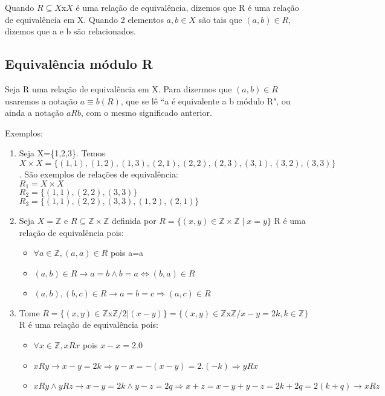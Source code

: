 Quando $R\subseteq X$x$X$ {\'e} uma rela{\c c}{\~a}o de equival{\^e}ncia, dizemos que R {\'e} uma rela{\c c}{\~a}o de equival{\^e}ncia em X. Quando 2 elementos $a,b\in X$ s{\~a}o tais que $(a,b)\in R$, dizemos que a e b s{\~a}o relacionados.\\

\subsection{Equival{\^e}ncia m{\'o}dulo R}

\begin{nota}
Seja R uma rela{\c c}{\~a}o de equival{\^e}ncia em X. Para dizermos que $(a,b)\in R$ usaremos a nota{\c c}{\~a}o $a\equiv b(R)$, que se l{\^e} ``a é equivalente a b m{\'o}dulo R", ou ainda a nota{\c c}{\~a}o $aRb$, com o mesmo significado anterior.
\end{nota}

Exemplos:
\begin{enumerate}
\item Seja X=\{1,2,3\}. Temos $X\times X=\{(1,1),(1,2),(1,3),(2,1),(2,2),(2,3),(3,1),(3,2),(3,3)\}$.
S{\~a}o exemplos de rela{\c c}{\~o}es de equival{\^e}ncia:\\
$R_{1}=X\times X$\\
$R_{2}=\{(1,1),(2,2),(3,3)\}$\\
$R_{3}=\{(1,1),(2,2),(3,3),(1,2),(2,1)\}$
\item Seja $X=\mathbb{Z}$ e $R\subseteq \mathbb{Z}\times \mathbb{Z}$ definida por $R=\{(x,y)\in \mathbb{Z} \times \mathbb{Z} \mid x=y\}$
R {\'e} uma rela{\c c}{\~a}o de equival{\^e}ncia pois:
\begin{itemize}
\item $\forall a \in \mathbb{Z}, (a,a) \in R$ pois a=a
\item $(a,b)\in R \rightarrow a=b \wedge b=a \Leftrightarrow (b,a)\in R$
\item $(a,b),(b,c)\in R \rightarrow a=b=c\Rightarrow (a,c)\in R$
\end{itemize}
\item Tome $R=\{(x,y)\in \mathbb{Z}$x$\mathbb{Z}/ 2|(x-y)\}=\{(x,y)\in\mathbb{Z}$x$\mathbb{Z}/ x-y=2k, k\in\mathbb{Z}\}$\\
R {\'e} uma rela{\c c}{\~a}o de equival{\^e}ncia pois:
\begin{itemize}
\item $\forall x\in\mathbb{Z},xRx$ pois $x-x=2.0$
\item $xRy\rightarrow x-y=2k\Rightarrow y-x=-(x-y)=2.(-k)\Rightarrow yRx$
\item $xRy\wedge yRz\rightarrow x-y=2k\wedge y-z=2q\Rightarrow x+z=x-y+y-z=2k+2q=2(k+q)\rightarrow xRz$

\end{itemize}
\end{enumerate}

